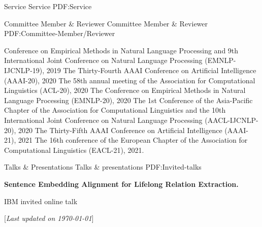 \documentclass[letterpaper,MMMyyyy,nonstopmode]{simpleresumecv}
\newcommand{\CVNote}{Last updated on {\today}}
\begin{document}
\begin{Body}
\Section
{Service}
{Service}
{PDF:Service}

\SubSection
{Committee Member \& Reviewer}
{Committee Member \& Reviewer}
{PDF:Committee-Member/Reviewer}

    \BulletItem Conference on Empirical Methods in Natural Language Processing and 9th International Joint Conference on Natural Language Processing (EMNLP-IJCNLP-19), 2019
    \BulletItem The Thirty-Fourth AAAI Conference on Artificial Intelligence (AAAI-20), 2020
    \BulletItem The 58th annual meeting of the Association for Computational Linguistics (ACL-20), 2020
    \BulletItem The Conference on Empirical Methods in Natural Language Processing (EMNLP-20), 2020
    \BulletItem The 1st Conference of the Asia-Pacific Chapter of the Association for Computational Linguistics and the 10th International Joint Conference on Natural Language Processing (AACL-IJCNLP-20), 2020
    \BulletItem The Thirty-Fifth AAAI Conference on Artificial Intelligence (AAAI-21), 2021
    \BulletItem The 16th conference of the European Chapter of the Association for Computational Linguistics (EACL-21), 2021. 

\Section
{Talks \& \newline Presentations}
{Talks \& presentations}
{PDF:Invited-talks}

\Entry \textbf{Sentence Embedding Alignment for Lifelong Relation Extraction.} \hfill {}
\begin{Detail}
\BulletItem
IBM invited online talk
\end{Detail}


\end{Body}


\UseNoteFont%
\null\hfill%
[\textit{\CVNote}]
\end{document}
